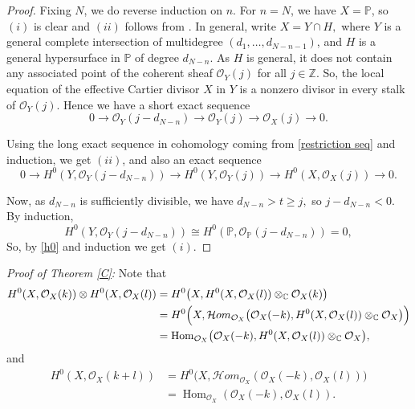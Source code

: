 \documentclass[11pt,letterpaper]{amsart}
\begin{document}
\begin{proof}
Fixing $N$, we do reverse induction on $n$. For $n=N$, we have $X=\mathbb{P}$, so $(i)$ is
clear and $(ii)$ follows from \cite[Section 1.4]{dolgachev2006weighted}. In general, write $X=Y\cap H,$
where $Y$ is a general complete intersection of multidegree
$(d_1,\ldots,d_{N-n-1})$, and $H$ is a general hypersurface in
$\mathbb{P}$ of degree $d_{N-n}$. As $H$ is general, it does not contain any associated point of the coherent
sheaf $\mathcal{O}_Y(j)$ for all $j\in\mathbb{Z}$. So, the local equation of
the effective Cartier divisor $X$ in $Y$ is a nonzero divisor in every stalk
of $\mathcal{O}_Y(j)$. Hence we have a short exact sequence
\begin{equation}\label{restriction seq}
0
\longrightarrow
\mathcal{O}_Y(j-d_{N-n})
\longrightarrow
\mathcal{O}_Y(j)
\longrightarrow
\mathcal{O}_X(j)
\longrightarrow
0.
\end{equation}

Using the long exact sequence in cohomology coming from \eqref{restriction seq} and induction, we
get $(ii)$, and also an exact sequence
\begin{equation}\label{h0}
0
\longrightarrow
H^0\!\left(Y,\mathcal{O}_Y(j-d_{N-n})\right)
\longrightarrow
H^0\!\left(Y,\mathcal{O}_Y(j)\right)
\longrightarrow
H^0\!\left(X,\mathcal{O}_X(j)\right)
\longrightarrow
0.
\end{equation}

Now, as $d_{N-n}$ is sufficiently divisible, we have $d_{N-n}>t\ge j,$
so $j-d_{N-n}<0.$
By induction,
\[
H^0\!\left(Y,\mathcal{O}_Y(j-d_{N-n})\right)
\cong
H^0\!\left(\mathbb{P},\mathcal{O}_{\mathbb{P}}(j-d_{N-n})\right)
=0,
\]
So, by \eqref{h0} and induction we get $(i)$.
\end{proof}
\textit{Proof of Theorem \ref{C}:}
Note that
\begin{align*}
H^0(X,\mathcal O_X(k))\otimes H^0(X,\mathcal O_X(l))
&=
H^0\bigl(X,H^0(X,\mathcal O_X(l))\otimes_{\mathbb C}\mathcal O_X(k)\bigr)\\
&=
H^0\Bigl(X,
\mathcal Hom_{\mathcal O_X}
\bigl(\mathcal O_X(-k),
H^0(X,\mathcal O_X(l))\otimes_{\mathbb C}\mathcal O_X
\bigr)
\Bigr)\\
&=
\operatorname{Hom}_{\mathcal O_X}
\bigl(
\mathcal O_X(-k),
H^0(X,\mathcal O_X(l))\otimes_{\mathbb C}\mathcal O_X
\bigr),
\end{align*}
and
\begin{align*}
H^0(X,\mathcal O_X(k+l))
&=
H^0\bigl(X,
\mathcal Hom_{\mathcal O_X}
(\mathcal O_X(-k),\mathcal O_X(l))
\bigr)\\
&=
\operatorname{Hom}_{\mathcal O_X}
(\mathcal O_X(-k),\mathcal O_X(l)).
\end{align*}
\end{document}
